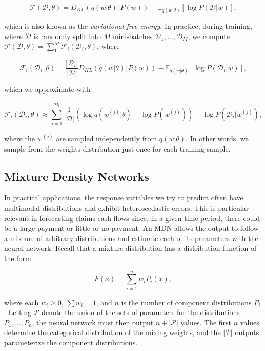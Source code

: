 \documentclass{article}
\begin{document}
\begin{equation}
    \mathcal{F}(\mathcal{D}, \theta) = D_{KL}(q(w|\theta) \Vert P(w)) - \mathbb{E}_{q(w|\theta)}[\log P(\mathcal{D}|w)],
\end{equation}

which is also known as the \textit{variational free energy}. In practice, during training, where $\mathcal{D}$ is randomly split into $M$ mini-batches $\mathcal{D}_1,\dots,\mathcal{D}_M$, we compute $\mathcal{F}(\mathcal{D}, \theta) = \sum_1^M \mathcal{F}_i(\mathcal{D}_i, \theta)$, where

\begin{equation}
    \mathcal{F}_i(\mathcal{D}_i, \theta) = \frac{|\mathcal{D}_i|}{|\mathcal{D}|}D_{KL}(q(w|\theta) \Vert P(w)) - \mathbb{E}_{q(w|\theta)}[\log P(\mathcal{D}_i|w)],
\end{equation}

which we approximate with

\begin{equation}
    \mathcal{F}_i(\mathcal{D}_i, \theta) \approx \sum_{j=1}^{|\mathcal{D}_i|} \frac{1}{|\mathcal{D}|} ( \log q(w^{(j)}|\theta) - \log P(w^{(j)}) ) - \log P(\mathcal{D}_i|w^{(j)}),
\end{equation}

where the $w^{(j)}$ are sampled independently from $q(w|\theta)$. In other words, we sample from the weights distribution just once for each training sample.

\subsection{Mixture Density Networks}\label{section:mdn}

In practical applications, the response variables we try to predict often have multimodal distributions and exhibit heteroscedastic errors. This is particular relevant in forecasting claims cash flows since, in a given time period, there could be a large payment or little or no payment. An MDN allows the output to follow a mixture of arbitrary distributions and estimate each of its parameters with the neural network. Recall that a mixture distribution has a distribution function of the form

\begin{equation}
    F(x) = \sum_{i = 1}^n w_i P_i(x),
\end{equation}

where each $w_i \geq 0$, $\sum w_i = 1$, and $n$ is the number of component distributions $P_i$. Letting $\mathcal{P}$ denote the union of the sets of parameters for the distributions $P_1, \dots, P_n$, the neural network must then output $n + |\mathcal{P}|$ values. The first $n$ values determine the categorical distribution of the mixing weights, and the $|\mathcal{P}|$ outputs parameterize the component distributions.
\end{document}
